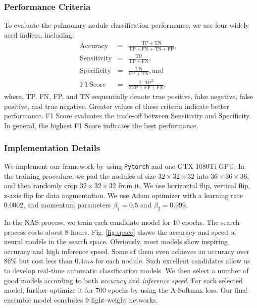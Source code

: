 \documentclass[final,5p,times,twocolumn]{elsarticle}
\begin{document}
\subsubsection{Performance Criteria} 
\label{ssec:exp_crit}
To evaluate the pulmonary nodule classification performance, we use four widely used indices, including:
\begin{eqnarray}
\label{Eq:Precision}
	\mathrm{Accuracy} & = & \frac{\mathrm{TP+TN}}{\mathrm{TP+FN+TN+FP}},\\
    \mathrm{Sensitivity} & = & \frac{\mathrm{TP}}{\mathrm{TP+FN}},\\    
    \mathrm{Specificity} & = & \frac{\mathrm{TN}}{\mathrm{FP+TN}}, \text{and}\\
    \mathrm{F1~Score} & = & \frac{\mathrm{2 \cdot TP^2}}{\mathrm{2TP+FP+FN}},
\end{eqnarray}
where, TP, FN, FP, and TN sequentially denote true positive, false negative, false positive, and true negative. Greater values of these criteria indicate better performance. F1 Score evaluates the trade-off between Sensitivity and Specificity. In general, the highest F1 Score indicates the best performance. 


\subsubsection{Implementation Details} 
\label{ssec:train}
We implement our framework by using \texttt{Pytorch} and one GTX 1080Ti GPU. In the training procedure, we pad the nodules of size $32 \times 32 \times 32$ into $36 \times 36 \times 36$, and then randomly crop $32 \times 32 \times 32$ from it. We use horizontal flip, vertical flip, z-axis flip for data augmentation. We use Adam optimizer with a learning rate $0.0002$, and momentum parameters $\beta_1=0.5$ and $\beta_2=0.999$. 

In the NAS process, we train each candidate model for $10$ epochs. The search process costs about 8 hours. Fig. \ref{fig:space} shows the accuracy and speed of neural models in the search space. Obviously, most models show inspiring accuracy and high inference speed. Some of them even achieves an accuracy over $86\%$ but cost less than $0.4 ms$ for each nodule. Such excellent candidates allow us to develop real-time automatic classification models. We then select a number of good models according to both \textit{accuracy} and \textit{inference speed}. For each selected model, further optimize it for $700$ epochs by using the A-Softmax loss. Our final ensemble model concludes 9 light-weight networks. 
\end{document}
